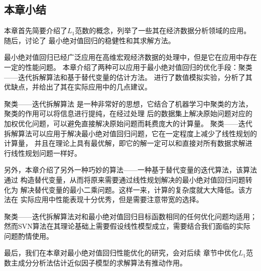 

\subsection{本章小结}

本章首先简要介绍了$L_1$范数的概念，列举了一些其在经济数据分析领域的应用。随后，讨论了
最小绝对值回归的稳健性和其求解方法。

最小绝对值回归已经广泛应用在高维宏观经济数据的处理中，但是它在应用中存在一定的性能问题。
本章介绍了两种可以应用于最小绝对值回归的优化手段：聚类——迭代拆解算法和基于替代变量的估计方法。
进行了数值模拟实验，分析了其优缺点，并给出了其在实际应用中的几点建议。

聚类——迭代拆解算法
是一种非常好的思想，它结合了机器学习中聚类的方法，聚类的作用可以将信息进行提纯，在经过处理
后的数据集上解决原始问题对应的加权优化问题，可以避免直接解决原始问题而耗费庞大的计算量。
聚类——迭代拆解算法可以应用于解决最小绝对值回归问题，它在一定程度上减少了线性规划的计算量，
并且在理论上具有最优解，即它的解一定可以和直接对所有数据求解进行线性规划问题一样好。

另外，本章介绍了另外一种巧妙的算法——一种基于替代变量的迭代算法，该算法通过
构造替代变量，从而将原来需要通过线性规划解决的最小绝对值回归问题转化为
解决替代变量的最小二乘问题。这样一来，计算的复杂度就大大降低。该方法在
实际应用中性能表现十分优秀，但是需要注意带宽的选择。

聚类——迭代拆解算法对和最小绝对值回归目标函数相同的任何优化问题均适用；
然而SVN算法在其理论基础上需要假设线性模型成立，需要结合我们面临的实际问题酌情使用。

最后，我们在本章对最小绝对值回归性能优化的研究，会对后续
章节中优化$L_1$范数主成分分析法估计近似因子模型的求解算法有推动作用。
